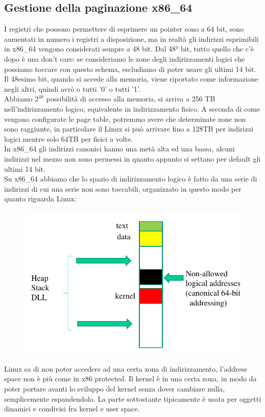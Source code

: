 \documentclass[12pt, oneside]{extbook}
\begin{document}
\subsection{Gestione della paginazione x86\_64}
I registri che possono permettere di esprimere un pointer sono a 64 bit, sono aumentati in numero i registri a disposizione, ma in realtà gli indirizzi esprimibili in x86\_64 vengono considerati sempre a 48 bit. Dal 48° bit, tutto quello che c'è dopo è una don't care: se consideriamo le zone degli indirizzamenti logici che possiamo toccare con questo schema, escludiamo di poter usare gli ultimi 14 bit. Il 48esimo bit, quando si accede alla memoria, viene riportato come informazione negli altri, quindi avrò o tutti '0' o tutti '1'. \\Abbiamo $2^{48}$ possibilità di accesso alla memoria, si arriva a 256 TB nell'indirizzamento logico, equivalente in indirizzamento fisico. A seconda di come vengono configurate le page table, potremmo avere che determinate zone non sono raggiunte, in particolare il Linux si può arrivare fino a 128TB per indirizzi logici mentre solo 64TB per fisici a volte.\\ In x86\_64 gli indirizzi canonici hanno una metà alta ed una bassa, alcuni indirizzi nel mezzo non sono permessi in quanto appunto si settano per default gli ultimi 14 bit.\\ Su x86\_64 abbiamo che lo spazio di indirizzamento logico è fatto da una serie di indirizzi di cui una serie non sono toccabili, organizzato in questo modo per quanto riguarda Linux:
\begin{figure}[!h]
	\includegraphics[scale=0.4]{immagini/addressing_x86-64.png}
\end{figure}
Linux sa di non poter accedere ad una certa zona di indirizzamento, l'address space non è più come in x86 protected. Il kernel è in una certa zona, in modo da poter portare avanti lo sviluppo del kernel senza dover cambiare nulla, semplicemente espandendolo. La parte sottostante tipicamente è usata per oggetti dinamici e condivisi fra kernel e user space.
\end{document}
